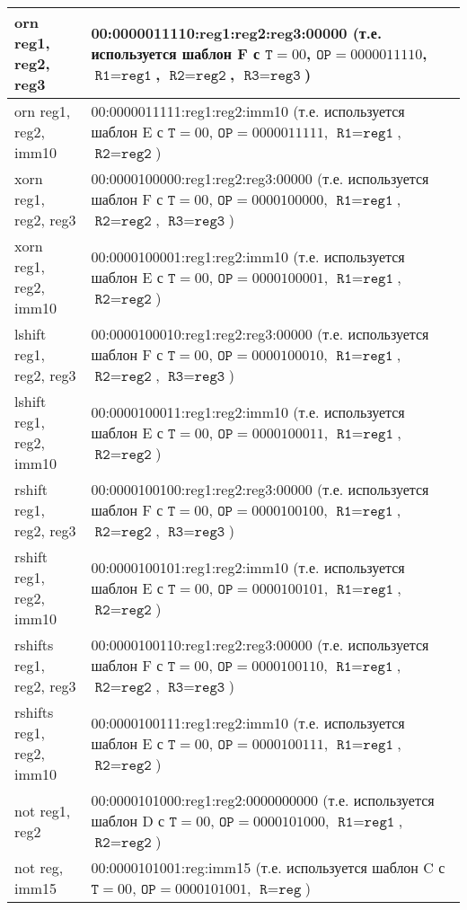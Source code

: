 \documentclass[10pt]{report}
\begin{document}
\begin{longtable}[c]{|l|p{12.5cm}|}
orn reg1, reg2, reg3            & 00:0000011110:reg1:reg2:reg3:00000 (т.е. используется шаблон F с $\texttt{T}=00$, $\texttt{OP}=0000011110$, $\texttt{R1}=\texttt{reg1}$, $\texttt{R2}=\texttt{reg2}$,  $\texttt{R3}=\texttt{reg3}$) \\ \hline
orn reg1, reg2, imm10           & 00:0000011111:reg1:reg2:imm10 (т.е. используется шаблон E с $\texttt{T}=00$, $\texttt{OP}=0000011111$, $\texttt{R1}=\texttt{reg1}$, $\texttt{R2}=\texttt{reg2}$) \\ \hline
xorn reg1, reg2, reg3           & 00:0000100000:reg1:reg2:reg3:00000 (т.е. используется шаблон F с $\texttt{T}=00$, $\texttt{OP}=0000100000$, $\texttt{R1}=\texttt{reg1}$, $\texttt{R2}=\texttt{reg2}$,  $\texttt{R3}=\texttt{reg3}$) \\ \hline
xorn reg1, reg2, imm10          & 00:0000100001:reg1:reg2:imm10 (т.е. используется шаблон E с $\texttt{T}=00$, $\texttt{OP}=0000100001$, $\texttt{R1}=\texttt{reg1}$, $\texttt{R2}=\texttt{reg2}$) \\ \hline
lshift reg1, reg2, reg3         & 00:0000100010:reg1:reg2:reg3:00000 (т.е. используется шаблон F с $\texttt{T}=00$, $\texttt{OP}=0000100010$, $\texttt{R1}=\texttt{reg1}$, $\texttt{R2}=\texttt{reg2}$,  $\texttt{R3}=\texttt{reg3}$) \\ \hline
lshift reg1, reg2, imm10        & 00:0000100011:reg1:reg2:imm10 (т.е. используется шаблон E с $\texttt{T}=00$, $\texttt{OP}=0000100011$, $\texttt{R1}=\texttt{reg1}$, $\texttt{R2}=\texttt{reg2}$) \\ \hline
rshift reg1, reg2, reg3         & 00:0000100100:reg1:reg2:reg3:00000 (т.е. используется шаблон F с $\texttt{T}=00$, $\texttt{OP}=0000100100$, $\texttt{R1}=\texttt{reg1}$, $\texttt{R2}=\texttt{reg2}$,  $\texttt{R3}=\texttt{reg3}$) \\ \hline
rshift reg1, reg2, imm10        & 00:0000100101:reg1:reg2:imm10 (т.е. используется шаблон E с $\texttt{T}=00$, $\texttt{OP}=0000100101$, $\texttt{R1}=\texttt{reg1}$, $\texttt{R2}=\texttt{reg2}$) \\ \hline
rshifts reg1, reg2, reg3        & 00:0000100110:reg1:reg2:reg3:00000 (т.е. используется шаблон F с $\texttt{T}=00$, $\texttt{OP}=0000100110$, $\texttt{R1}=\texttt{reg1}$, $\texttt{R2}=\texttt{reg2}$,  $\texttt{R3}=\texttt{reg3}$) \\ \hline
rshifts reg1, reg2, imm10       & 00:0000100111:reg1:reg2:imm10 (т.е. используется шаблон E с $\texttt{T}=00$, $\texttt{OP}=0000100111$, $\texttt{R1}=\texttt{reg1}$, $\texttt{R2}=\texttt{reg2}$) \\ \hline
not reg1, reg2                  & 00:0000101000:reg1:reg2:0000000000 (т.е. используется шаблон D с $\texttt{T}=00$, $\texttt{OP}=0000101000$, $\texttt{R1}=\texttt{reg1}$, $\texttt{R2}=\texttt{reg2}$) \\ \hline
not reg, imm15                  & 00:0000101001:reg:imm15  (т.е. используется шаблон C с $\texttt{T}=00$, $\texttt{OP}=0000101001$, $\texttt{R}=\texttt{reg}$)\\ \hline
\end{longtable}      
    
\end{document}
